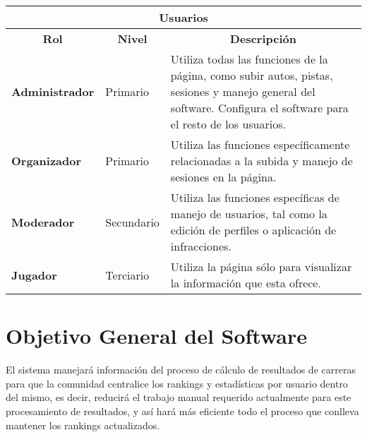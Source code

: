 \begin{center}
	\begin{tabular}{| p{3cm} | p{3cm} | p{10cm} |}
		\hline
		\multicolumn{3}{|c|}{\textbf{Usuarios}} \\
		\hline
		\multicolumn{1}{|c|}{\textbf{Rol}} & \multicolumn{1}{|c|}{\textbf{Nivel}} & \multicolumn{1}{|c|}{\textbf{Descripción}} \\
		\hline
		{\textbf{Administrador}} & Primario & Utiliza todas las funciones de la página, como subir autos, pistas, sesiones y manejo general del software. Configura el software para el resto de los usuarios.\\ \hline
		{\textbf{Organizador}} & Primario & Utiliza las funciones específicamente relacionadas a la subida y manejo de sesiones en la página.\\ \hline
		{\textbf{Moderador}} & Secundario & Utiliza las funciones específicas de manejo de usuarios, tal como la edición de perfiles o aplicación de infracciones. \\ \hline
		{\textbf{Jugador}} & Terciario & Utiliza la página sólo para visualizar la información que esta ofrece. \\ \hline
	\end{tabular}
  
  \label{table:users:type}
\end{center}

\section{Objetivo General del Software}
El sistema manejará información del proceso de cálculo de resultados de carreras para que la comunidad centralice los rankings y estadísticas por usuario dentro del mismo, es decir, reducirá el trabajo manual requerido actualmente para este procesamiento de resultados, y así hará más eficiente todo el proceso que conlleva mantener los rankings actualizados.

